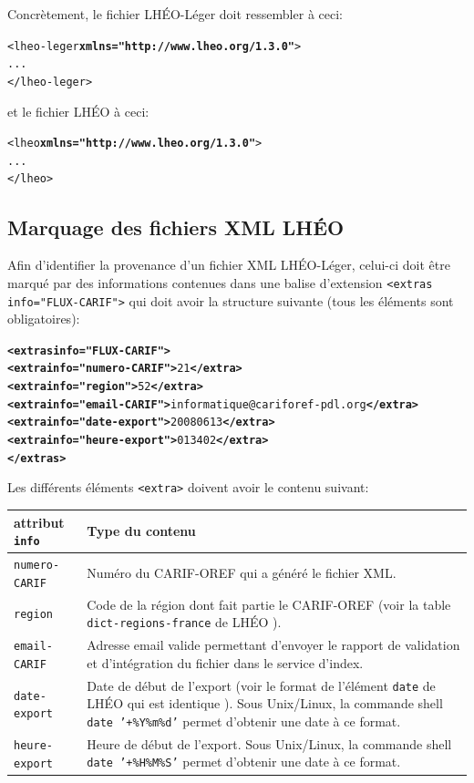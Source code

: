 \documentclass[a4paper]{report}
\begin{document}
Concrètement, le fichier LHÉO-Léger doit ressembler à ceci:

\begin{alltt}
<lheo-leger \textbf{xmlns="http://www.lheo.org/1.3.0"}>
  ...
</lheo-leger>
\end{alltt}

et le fichier LHÉO à ceci:

\begin{alltt}
<lheo \textbf{xmlns="http://www.lheo.org/1.3.0"}>
  ...
</lheo>
\end{alltt}

\subsection{Marquage des fichiers XML LHÉO}

Afin d'identifier la provenance d'un fichier XML LHÉO-Léger, celui-ci
doit être marqué par des informations contenues dans une balise
d'extension \texttt{<extras info="FLUX-CARIF">} qui doit avoir la
structure suivante (tous les éléments sont obligatoires):

\begin{alltt}
  \textbf{<extras info="FLUX-CARIF">}
    \textbf{<extra info="numero-CARIF">}21\textbf{</extra>}
    \textbf{<extra info="region">}52\textbf{</extra>}
    \textbf{<extra info="email-CARIF">}informatique@cariforef-pdl.org\textbf{</extra>}
    \textbf{<extra info="date-export">}20080613\textbf{</extra>}
    \textbf{<extra info="heure-export">}013402\textbf{</extra>}
  \textbf{</extras>}
\end{alltt}

Les différents éléments \texttt{<extra>} doivent avoir le contenu
suivant:

\begin{center}
\begin{tabular}{|p{}|p{}|}\hline
  \textbf{attribut \texttt{info}} & Type du contenu \\\hline\hline
  \texttt{numero-CARIF} & Numéro du CARIF-OREF qui a généré le fichier XML.\\\hline
  \texttt{region} & Code de la région dont fait partie le CARIF-OREF (voir la table \texttt{dict-regions-france} de LHÉO \cite{WEB-LHEO,MANUEL-LHEO}).\\\hline
  \texttt{email-CARIF} & Adresse email valide permettant d'envoyer le rapport de validation et d'intégration du fichier dans le service d'index.\\\hline
  \texttt{date-export} & Date de début de l'export (voir le format de l'élément \texttt{date} de LHÉO qui est identique \cite{WEB-LHEO,MANUEL-LHEO}). Sous Unix/Linux, la commande shell \texttt{date '+\%Y\%m\%d'} permet d'obtenir une date à ce format.\\\hline
  \texttt{heure-export} & Heure de début de l'export. Sous Unix/Linux, la commande shell \texttt{date '+\%H\%M\%S'} permet d'obtenir une date à ce format.\\
  \hline
\end{tabular}
\end{center}
\end{document}
